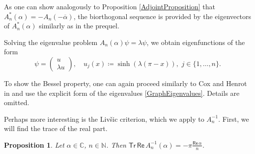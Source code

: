 \documentclass[11pt, a4paper,reqno]{amsart}
\theoremstyle{plain}
\newtheorem{proposition}[theorem]{Proposition}
\theoremstyle{definition}
\theoremstyle{remark}
\newcommand{\1}{\mathds 1}
\renewcommand{\Re}{\mathsf{Re}\,}
\newcommand{\Tr}{\mathsf{Tr}\,}
\begin{document}
As one can show analogously to Proposition \ref{AdjointProposition} that $A_n^\ast(\alpha) = -A_n\left(-\overline\alpha\right)$, the biorthogonal sequence is provided by the eigenvectors of $A_n^\ast(\alpha)$ similarly as in the prequel.

Solving the eigenvalue problem $A_n(\alpha) \psi = \lambda \psi$, we obtain eigenfunctions of the form
\[
\psi = \begin{pmatrix}
    u \\ \lambda u
\end{pmatrix}, \quad u_j(x) \coloneqq \sinh(\lambda(\pi-x)), \,\, j \in \{1, \dots, n\}. 
\]

To show the Bessel property, one can again proceed similarly to Cox and Henrot in \cite{CH} and use the explicit form of the eigenvalues \eqref{GraphEigenvalues}. Details are omitted. 

Perhaps more interesting is the Livšic criterion, which we apply to $A_n^{-1}$. First, we will find the trace of the real part.

\begin{proposition}\label{GraphTrace}
Let $\alpha \in \mathbb C$, $n \in \mathbb N$. Then $\Tr\Re A_n^{-1}(\alpha) = -\pi\frac{\Re\alpha}{n}$.
\end{proposition}
\end{document}

